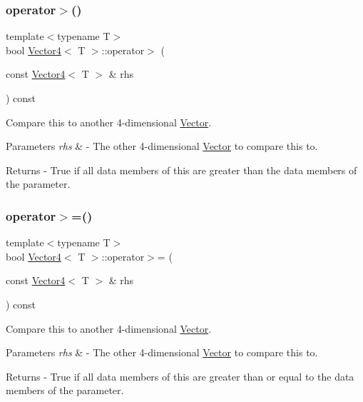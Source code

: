 \subsubsection{\texorpdfstring{operator$>$()}{operator>()}}
{\footnotesize\ttfamily template$<$typename T$>$ \\
bool \mbox{\hyperlink{class_vector4}{Vector4}}$<$ T $>$\+::operator$>$ (\begin{DoxyParamCaption}\item[{const \mbox{\hyperlink{class_vector4}{Vector4}}$<$ T $>$ \&}]{rhs }\end{DoxyParamCaption}) const}

Compare this to another 4-\/dimensional \mbox{\hyperlink{class_vector}{Vector}}. 
\begin{DoxyParams}{Parameters}
{\em rhs} & -\/ The other 4-\/dimensional \mbox{\hyperlink{class_vector}{Vector}} to compare this to. \\
\hline
\end{DoxyParams}
\begin{DoxyReturn}{Returns}
-\/ True if all data members of this are greater than the data members of the parameter. 
\end{DoxyReturn}
\mbox{\label{class_vector4_a775421e83f0bdf6cf96e9cd936e7cb38}} 
\subsubsection{\texorpdfstring{operator$>$=()}{operator>=()}}
{\footnotesize\ttfamily template$<$typename T$>$ \\
bool \mbox{\hyperlink{class_vector4}{Vector4}}$<$ T $>$\+::operator$>$= (\begin{DoxyParamCaption}\item[{const \mbox{\hyperlink{class_vector4}{Vector4}}$<$ T $>$ \&}]{rhs }\end{DoxyParamCaption}) const}

Compare this to another 4-\/dimensional \mbox{\hyperlink{class_vector}{Vector}}. 
\begin{DoxyParams}{Parameters}
{\em rhs} & -\/ The other 4-\/dimensional \mbox{\hyperlink{class_vector}{Vector}} to compare this to. \\
\hline
\end{DoxyParams}
\begin{DoxyReturn}{Returns}
-\/ True if all data members of this are greater than or equal to the data members of the parameter. 
\end{DoxyReturn}
\mbox{\label{class_vector4_a4fea99cf190d3d29f9aaa36acd07a49a}} 
